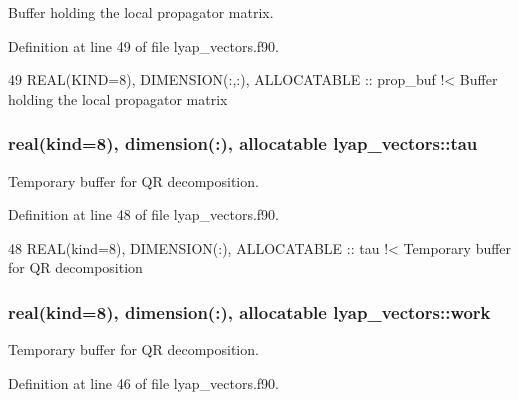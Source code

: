 Buffer holding the local propagator matrix. 



Definition at line 49 of file lyap\+\_\+vectors.\+f90.


\begin{DoxyCode}
49   \textcolor{keywordtype}{REAL(KIND=8)}, \textcolor{keywordtype}{DIMENSION(:,:)}, \textcolor{keywordtype}{ALLOCATABLE} :: prop\_buf\textcolor{comment}{ !< Buffer holding the local propagator matrix}
\end{DoxyCode}
\subsubsection[{\texorpdfstring{tau}{tau}}]{\setlength{\rightskip}{0pt plus 5cm}real(kind=8), dimension(\+:), allocatable lyap\+\_\+vectors\+::tau\hspace{0.3cm}{\ttfamily [private]}}\hypertarget{namespacelyap__vectors_a336c0490ac0927589648b33fe7abc733}{}\label{namespacelyap__vectors_a336c0490ac0927589648b33fe7abc733}


Temporary buffer for QR decomposition. 



Definition at line 48 of file lyap\+\_\+vectors.\+f90.


\begin{DoxyCode}
48   \textcolor{keywordtype}{REAL(kind=8)}, \textcolor{keywordtype}{DIMENSION(:)}, \textcolor{keywordtype}{ALLOCATABLE} :: tau\textcolor{comment}{        !< Temporary buffer for QR decomposition}
\end{DoxyCode}
\subsubsection[{\texorpdfstring{work}{work}}]{\setlength{\rightskip}{0pt plus 5cm}real(kind=8), dimension(\+:), allocatable lyap\+\_\+vectors\+::work\hspace{0.3cm}{\ttfamily [private]}}\hypertarget{namespacelyap__vectors_ac6e7ade9ca919e7183c90eb20f820ce4}{}\label{namespacelyap__vectors_ac6e7ade9ca919e7183c90eb20f820ce4}


Temporary buffer for QR decomposition. 



Definition at line 46 of file lyap\+\_\+vectors.\+f90.


